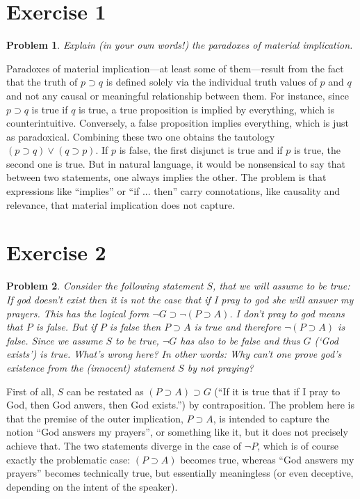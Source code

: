 \documentclass[a4paper,10pt]{article}
\newcommand{\imp}{\supset}
\newtheorem*{problem*}{Problem}
\theoremstyle{definition}
\begin{document}
\section{Exercise 1}
\begin{problem*}
Explain (in your own words!) the paradoxes of material implication.
\end{problem*}
Paradoxes of material implication—at least some of them—result from the fact that the truth of $p \imp q$ is defined solely via the individual truth values of $p$ and $q$ and not any causal or meaningful relationship between them. For instance, since $p \imp q$ is true if $q$ is true, a true proposition is implied by everything, which is counterintuitive. Conversely, a false proposition implies everything, which is just as paradoxical. Combining these two one obtains the tautology $(p \imp q) ∨ (q \imp p)$. If $p$ is false, the first disjunct is true and if $p$ is true, the second one is true. But in natural language, it would be nonsensical to say that between two statements, one always implies the other. The problem is that expressions like ``implies'' or ``if ... then'' carry connotations, like causality and relevance, that material implication does not capture.

\section{Exercise 2}
\begin{problem*}
Consider the following statement
$S$, that we will assume to be true:
\emph{If god doesn't exist then it is not the case that if I pray to god she will answer my prayers.}
This  has  the  logical  form $¬ G \imp ¬(P \imp A)$. I  don't  pray  to  god means  that $P$ is  false.   But  if $P$ is  false  then
$P \imp A$ is  true  and therefore $¬(P \imp A)$  is  false.   Since  we  assume $S$ to  be  true, $¬ G$ has also to be false and thus
$G$ (`God exists') is true.
What's  wrong  here?   In  other  words:  Why  can't  one  prove  god's existence from the (innocent) statement
$S$ by not praying?
\end{problem*}

First of all, $S$ can be restated as $(P \imp A) \imp G$ (``If it is true that if I pray to God, then God anwers, then God exists.'') by contraposition. The problem here is that the premise of the outer implication, $P \imp A$, is intended to capture the notion ``God answers my prayers'', or something like it, but it does not precisely achieve that. The two statements diverge in the case of $¬P$, which is of course exactly the problematic case: $(P \imp A)$ becomes true, whereas ``God answers my prayers'' becomes technically true, but essentially meaningless (or even deceptive, depending on the intent of the speaker).
\end{document}
